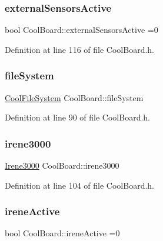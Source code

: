 \subsubsection{\texorpdfstring{external\+Sensors\+Active}{externalSensorsActive}}
{\footnotesize\ttfamily bool Cool\+Board\+::external\+Sensors\+Active =0\hspace{0.3cm}{\ttfamily [private]}}



Definition at line 116 of file Cool\+Board.\+h.

\mbox{\label{class_cool_board_a42c2586fbb13ff7f06538e9284e8538d}} 
\subsubsection{\texorpdfstring{file\+System}{fileSystem}}
{\footnotesize\ttfamily \hyperlink{class_cool_file_system}{Cool\+File\+System} Cool\+Board\+::file\+System\hspace{0.3cm}{\ttfamily [private]}}



Definition at line 90 of file Cool\+Board.\+h.

\mbox{\label{class_cool_board_ad103718ce316006c4695b8eb312eaf11}} 
\subsubsection{\texorpdfstring{irene3000}{irene3000}}
{\footnotesize\ttfamily \hyperlink{class_irene3000}{Irene3000} Cool\+Board\+::irene3000\hspace{0.3cm}{\ttfamily [private]}}



Definition at line 104 of file Cool\+Board.\+h.

\mbox{\label{class_cool_board_a9c3f7ac625481ee2ae802a25d97a4ae0}} 
\subsubsection{\texorpdfstring{irene\+Active}{ireneActive}}
{\footnotesize\ttfamily bool Cool\+Board\+::irene\+Active =0\hspace{0.3cm}{\ttfamily [private]}}



